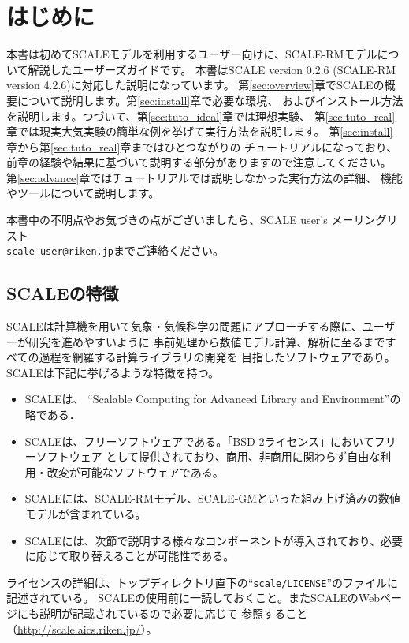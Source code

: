 \section{はじめに}

本書は初めてSCALEモデルを利用するユーザー向けに、SCALE-RMモデルについて解説したユーザーズガイドです。
本書はSCALE version 0.2.6 (SCALE-RM version 4.2.6)に対応した説明になっています。
第\ref{sec:overview}章でSCALEの概要について説明します。第\ref{sec:install}章で必要な環境、
およびインストール方法を説明します。つづいて、第\ref{sec:tuto_ideal}章では理想実験、
第\ref{sec:tuto_real}章では現実大気実験の簡単な例を挙げて実行方法を説明します。
第\ref{sec:install}章から第\ref{sec:tuto_real}章まではひとつながりの
チュートリアルになっており、前章の経験や結果に基づいて説明する部分がありますので注意してください。
第\ref{sec:advance}章ではチュートリアルでは説明しなかった実行方法の詳細、
機能やツールについて説明します。

本書中の不明点やお気づきの点がございましたら、SCALE user's メーリングリスト\\
 \verb|scale-user@riken.jp|までご連絡ください。



\subsection{SCALEの特徴}
SCALEは計算機を用いて気象・気候科学の問題にアプローチする際に、ユーザーが研究を進めやすいように
事前処理から数値モデル計算、解析に至るまですべての過程を網羅する計算ライブラリの開発を
目指したソフトウェアであり。SCALEは下記に挙げるような特徴を持つ。
\begin{itemize}
\item SCALEは、 ``Scalable Computing for Advanced Library and Environment''の略である．
\item SCALEは、フリーソフトウェアである。「BSD-2ライセンス」においてフリーソフトウェア
として提供されており、商用、非商用に関わらず自由な利用・改変が可能なソフトウェアである。
\item SCALEには、SCALE-RMモデル、SCALE-GMといった組み上げ済みの数値モデルが含まれている。
\item SCALEには、次節で説明する様々なコンポーネントが導入されており、必要に応じて取り替えることが可能性である。
\end{itemize}

ライセンスの詳細は、トップディレクトリ直下の``\verb|scale/LICENSE|''のファイルに記述されている。
SCALEの使用前に一読しておくこと。またSCALEのWebページにも説明が記載されているので必要に応じて
参照すること（\url{http://scale.aics.riken.jp/}）。

